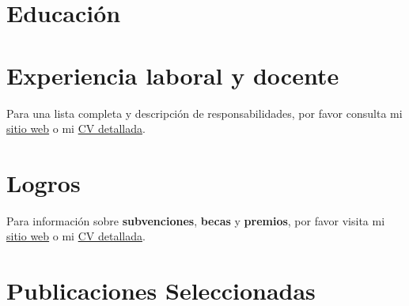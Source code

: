 \documentclass[11pt,a4paper,]{awesome-cv}
\begin{document}
\hypertarget{educaciuxf3n}{%
\section{Educación}\label{educaciuxf3n}}

\begin{cventries}
    \vspace{-4.0mm}
    \vspace{-4.0mm}
    \vspace{-4.0mm}
\end{cventries}

\hypertarget{experiencia-laboral-y-docente}{%
\section{Experiencia laboral y
docente}\label{experiencia-laboral-y-docente}}

Para una lista completa y descripción de responsabilidades, por favor
consulta mi \href{https://jdleongomez.info/es/\#experience}{sitio web} o
mi \href{https://jdleongomez.info/es/files/jdl_cv_es.pdf}{CV detallada}.

\begin{cventries}
    \vspace{-4.0mm}
    \vspace{-4.0mm}
\end{cventries}

\hypertarget{logros}{%
\section{Logros}\label{logros}}

Para información sobre \textbf{subvenciones}, \textbf{becas} y
\textbf{premios}, por favor visita mi
\href{https://jdleongomez.info/es/\#accomplishments}{sitio web} o mi
\href{https://jdleongomez.info/es/files/jdl_cv_es.pdf}{CV detallada}.

\hypertarget{publicaciones-seleccionadas}{%
\section{Publicaciones
Seleccionadas}\label{publicaciones-seleccionadas}}
\end{document}

